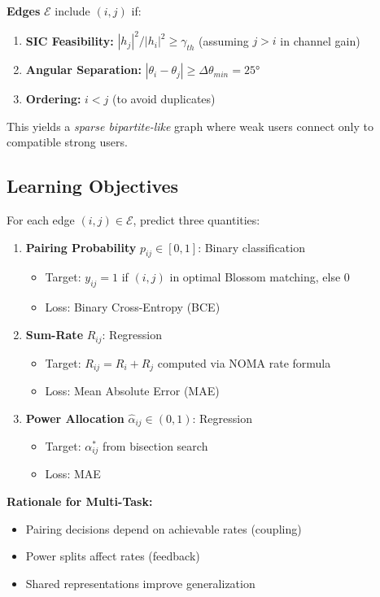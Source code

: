 \textbf{Edges} $\mathcal{E}$ include $(i,j)$ if:
\begin{enumerate}
    \item \textbf{SIC Feasibility:} $|h_j|^2 / |h_i|^2 \geq \gamma_{th}$ (assuming $j > i$ in channel gain)
    \item \textbf{Angular Separation:} $|\theta_i - \theta_j| \geq \Delta\theta_{min} = 25°$
    \item \textbf{Ordering:} $i < j$ (to avoid duplicates)
\end{enumerate}

This yields a \emph{sparse bipartite-like} graph where weak users connect only to compatible strong users.

\subsection{Learning Objectives}

For each edge $(i,j) \in \mathcal{E}$, predict three quantities:

\begin{enumerate}
    \item \textbf{Pairing Probability} $p_{ij} \in [0,1]$: Binary classification
    \begin{itemize}
        \item Target: $y_{ij} = 1$ if $(i,j)$ in optimal Blossom matching, else 0
        \item Loss: Binary Cross-Entropy (BCE)
    \end{itemize}
    
    \item \textbf{Sum-Rate} $\hat{R}_{ij}$: Regression
    \begin{itemize}
        \item Target: $R_{ij} = R_i + R_j$ computed via NOMA rate formula
        \item Loss: Mean Absolute Error (MAE)
    \end{itemize}
    
    \item \textbf{Power Allocation} $\hat{\alpha}_{ij} \in (0,1)$: Regression
    \begin{itemize}
        \item Target: $\alpha_{ij}^*$ from bisection search
        \item Loss: MAE
    \end{itemize}
\end{enumerate}

\textbf{Rationale for Multi-Task:}
\begin{itemize}
    \item Pairing decisions depend on achievable rates (coupling)
    \item Power splits affect rates (feedback)
    \item Shared representations improve generalization
\end{itemize}

